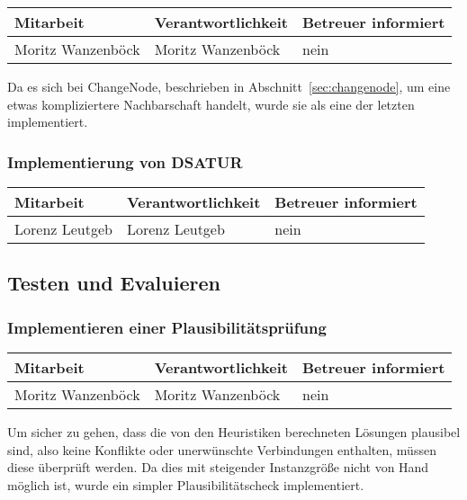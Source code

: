 \begin{center}
\begin{tabular}{lll}
	Mitarbeit & Verantwortlichkeit & Betreuer informiert \\
	\hline
	Moritz Wanzenböck & Moritz Wanzenböck & nein \\
\end{tabular}
\end{center}

Da es sich bei ChangeNode, beschrieben in Abschnitt~\ref{sec:changenode}, um eine etwas kompliziertere Nachbarschaft handelt, wurde sie als eine der letzten implementiert. 

\subsubsection{ Implementierung von DSATUR}

\begin{center}
\begin{tabular}{lll}
	Mitarbeit & Verantwortlichkeit & Betreuer informiert \\
	\hline
	Lorenz Leutgeb & Lorenz Leutgeb & nein \\
\end{tabular}
\end{center}

\subsection{Testen und Evaluieren}

\subsubsection{ Implementieren einer Plausibilitätsprüfung}

\begin{center}
\begin{tabular}{lll}
	Mitarbeit & Verantwortlichkeit & Betreuer informiert \\
	\hline
	Moritz Wanzenböck & Moritz Wanzenböck & nein \\
\end{tabular}
\end{center}

Um sicher zu gehen, dass die von den Heuristiken berechneten Lösungen plausibel sind, also keine Konflikte oder unerwünschte Verbindungen enthalten, müssen diese überprüft werden. Da dies mit steigender Instanzgröße nicht von Hand möglich ist, wurde ein simpler Plau\-si\-bi\-li\-täts\-check implementiert.

